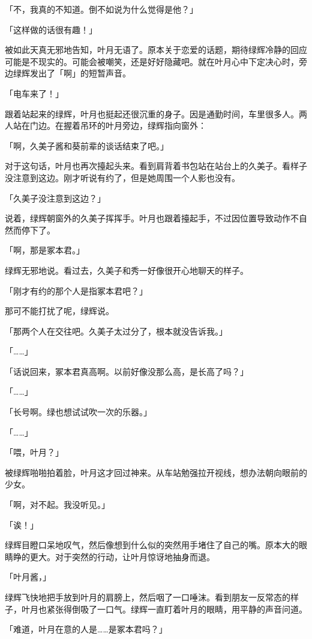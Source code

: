 \documentclass[UTF8]{ctexart}
\begin{document}
    「不，我真的不知道。倒不如说为什么觉得是他？」

    「这样做的话很有趣！」

    被如此天真无邪地告知，叶月无语了。原本关于恋爱的话题，期待绿辉冷静的回应可能是不现实的。可能会被嘲笑，还是好好隐藏吧。就在叶月心中下定决心时，旁边绿辉发出了「啊」的短暂声音。

    「电车来了！」

    跟着站起来的绿辉，叶月也挺起还很沉重的身子。因是通勤时间，车里很多人。两人站在门边。在握着吊环的叶月旁边，绿辉指向窗外：

    「啊，久美子酱和葵前辈的谈话结束了吧。」

    对于这句话，叶月也再次擡起头来。看到肩背着书包站在站台上的久美子。看样子没注意到这边。刚才听说有约了，但是她周围一个人影也没有。

    「久美子没注意到这边？」

    说着，绿辉朝窗外的久美子挥挥手。叶月也跟着擡起手，不过因位置导致动作不自然而停下了。

    「啊，那是冢本君。」

    绿辉无邪地说。看过去，久美子和秀一好像很开心地聊天的样子。

    「刚才有约的那个人是指冢本君吧？」

    那可不能打扰了呢，绿辉说。

    「那两个人在交往吧。久美子太过分了，根本就没告诉我。」

    「……」

    「话说回来，冢本君真高啊。以前好像没那么高，是长高了吗？」

    「……」

    「长号啊。绿也想试试吹一次的乐器。」

    「……」

    「喂，叶月？」

    被绿辉啪啪拍着脸，叶月这才回过神来。从车站勉强拉开视线，想办法朝向眼前的少女。

    「啊，对不起。我没听见。」

    「诶！」

    绿辉目瞪口呆地叹气，然后像想到什么似的突然用手堵住了自己的嘴。原本大的眼睛睁的更大。对于突然的行动，让叶月惊讶地抽身而退。

    「叶月酱，」

    绿辉飞快地把手放到叶月的肩膀上，然后咽了一口唾沫。看到朋友一反常态的样子，叶月也紧张得倒吸了一口气。绿辉一直盯着叶月的眼睛，用平静的声音问道。

    「难道，叶月在意的人是……是冢本君吗？」
\end{document}
